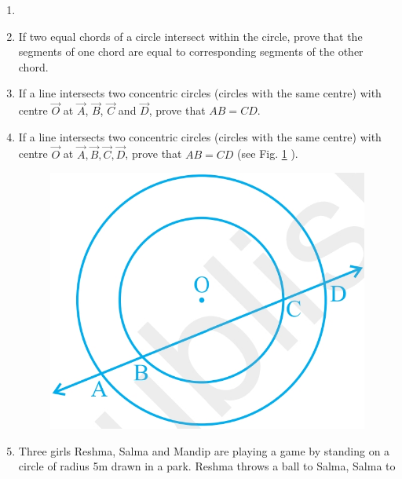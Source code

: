 \begin{enumerate}[label=\thesection.\arabic*,ref=\thesection.\theenumi]
\item 
\label{chapters/9/10/4/1}

\item If two equal chords of a circle intersect within the circle, prove 
that the segments of one chord are equal to corresponding segments of the other 
chord.
\label{chapters/9/10/4/2}
\\
\solution 

\item If a line intersects two concentric circles (circles
with the same centre) with centre $\vec{O}$ at $\vec{A}$, $\vec{B}$, $\vec{C}$ and $\vec{D}$, prove that $AB = CD$.
		\label{chapters/9/10/4/4/}
\\
\solution 

\item If a line intersects two concentric circles (circles with the same 
centre) with centre $\vec{O}$ at $\vec{A}, \vec{B}, \vec{C}, \vec{D}$, prove 
that $AB = CD$ (see Fig. 
		\ref{fig:chapters/9/10/41} ).
\begin{figure}[!ht]
    \centering
    \includegraphics[width=\columnwidth]{chapters/9/10/4/figs/fig1.jpg}
    \caption{}
    \label{fig:chapters/9/10/41}
\end{figure}
\item Three girls Reshma, Salma and Mandip are playing a game by standing on 
a circle of radius 5m drawn in a park. Reshma throws a ball to Salma, Salma to 

\end{enumerate}
